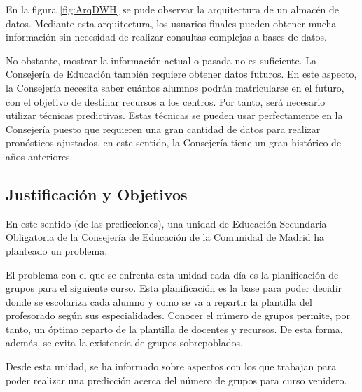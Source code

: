 En la figura \ref{fig:ArqDWH} se pude observar la arquitectura de un almacén de datos. Mediante esta arquitectura, los usuarios finales pueden obtener mucha información sin necesidad de realizar consultas complejas a bases de datos.

No obstante, mostrar la información actual o pasada no es suficiente. La Consejería de Educación también requiere obtener datos futuros. En este aspecto, la Consejería necesita saber cuántos alumnos podrán matricularse en el futuro, con el objetivo de destinar recursos a los centros.
Por tanto, será necesario utilizar técnicas predictivas. Estas técnicas se pueden usar perfectamente en la Consejería puesto que requieren una gran cantidad de datos para realizar pronósticos ajustados, en este sentido, la Consejería tiene un gran histórico de años anteriores.

\subsection{Justificación y Objetivos}
En este sentido (de las predicciones), una unidad de Educación Secundaria Obligatoria de la Consejería de Educación de la Comunidad de Madrid ha planteado un problema.

El problema con el que se enfrenta esta unidad cada día es la planificación de grupos para el siguiente curso. Esta planificación es la base para poder decidir donde se escolariza cada alumno y como se va a repartir la plantilla del profesorado según sus especialidades. Conocer el número de grupos permite, por tanto, un óptimo reparto de la plantilla de docentes y recursos. De esta forma, además, se evita la existencia de grupos sobrepoblados.

Desde esta unidad, se ha informado sobre aspectos con los que trabajan para poder realizar una predicción acerca del número de grupos para curso venidero. 

